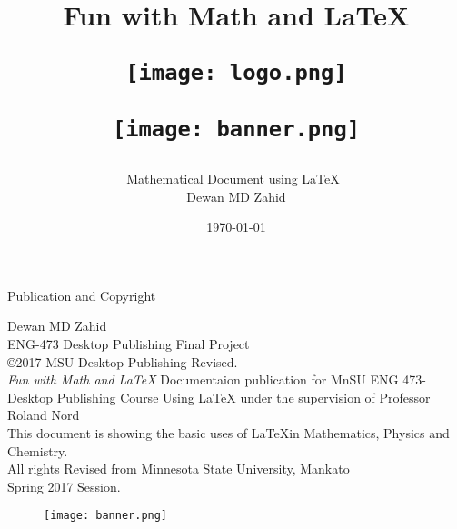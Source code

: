 \documentclass[12pt, a4paper]{article}
\begin{document}
\title{
\huge
{Fun with Math and \LaTeX }
\author{Mathematical Document using \LaTeX\ \\ Dewan MD Zahid}
\date{\today}
\linebreak
\texttt{[image: logo.png]}
\begin{figure} [b]
\texttt{[image: banner.png]}
\end{figure}
}
\maketitle


\pagebreak

\tableofcontents
\setcounter{page}{1}
\pagebreak

\begin{center}
\Huge{Publication and Copyright}\\
\end{center}
\vfill


\begin{center}
\noindent
Dewan MD Zahid\\ 
ENG-473 Desktop Publishing Final Project\\
©2017 MSU Desktop Publishing Revised.\\
\emph{Fun with Math and \LaTeX }
Documentaion publication for MnSU ENG 473-Desktop Publishing Course Using \LaTeX
under the supervision of Professor Roland Nord\\
This document is showing the basic uses of \LaTeX  in Mathematics, Physics and Chemistry.\\
All rights Revised from Minnesota State University, Mankato\\
Spring 2017 Session.
\end{center}
\begin{figure} [b]
\texttt{[image: banner.png]}
\end{figure}
\clearpage %
\end{document}

